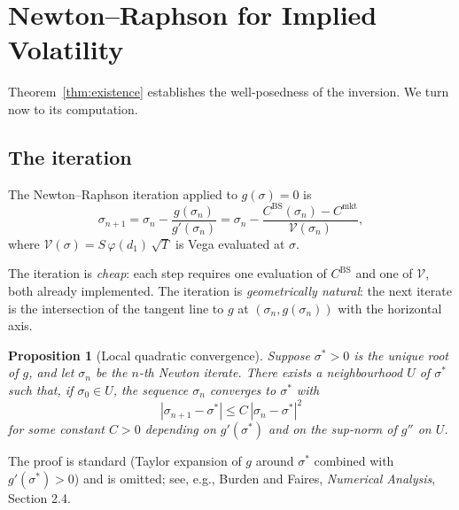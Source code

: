 \documentclass[11pt,a4paper]{article}
\theoremstyle{plain}
\newtheorem{proposition}[theorem]{Proposition}
\theoremstyle{definition}
\theoremstyle{remark}
\newcommand{\BS}{\mathrm{BS}}
\begin{document}
\section{Newton--Raphson for Implied Volatility}

Theorem~\ref{thm:existence} establishes the well-posedness of the
inversion. We turn now to its computation.

\subsection{The iteration}

The Newton--Raphson iteration applied to \(g(\sigma) = 0\) is
\begin{equation}
    \sigma_{n+1}
    = \sigma_n - \frac{g(\sigma_n)}{g'(\sigma_n)}
    = \sigma_n
        - \frac{C^{\BS}(\sigma_n) - C^{\mathrm{mkt}}}{\mathcal{V}(\sigma_n)},
    \label{eq:newton}
\end{equation}
where \(\mathcal{V}(\sigma) = S\,\varphi(d_1)\,\sqrt{T}\) is Vega
evaluated at \(\sigma\).

The iteration is \emph{cheap}: each step requires one evaluation of
\(C^{\BS}\) and one of \(\mathcal{V}\), both already implemented.
The iteration is \emph{geometrically natural}: the next iterate is
the intersection of the tangent line to \(g\) at \((\sigma_n, g(\sigma_n))\)
with the horizontal axis.

\begin{proposition}[Local quadratic convergence]
\label{prop:newton-quadratic}
Suppose \(\sigma^* > 0\) is the unique root of \(g\), and let
\(\sigma_n\) be the \(n\)-th Newton iterate. There exists a
neighbourhood \(U\) of \(\sigma^*\) such that, if \(\sigma_0 \in U\),
the sequence \(\sigma_n\) converges to \(\sigma^*\) with
\[
    |\sigma_{n+1} - \sigma^*|
    \leq C\, |\sigma_n - \sigma^*|^2
\]
for some constant \(C > 0\) depending on \(g'(\sigma^*)\) and on the
sup-norm of \(g''\) on \(U\).
\end{proposition}

The proof is standard (Taylor expansion of \(g\) around \(\sigma^*\)
combined with \(g'(\sigma^*) > 0\)) and is omitted; see, e.g., Burden
and Faires, \emph{Numerical Analysis}, Section 2.4.

\end{document}
